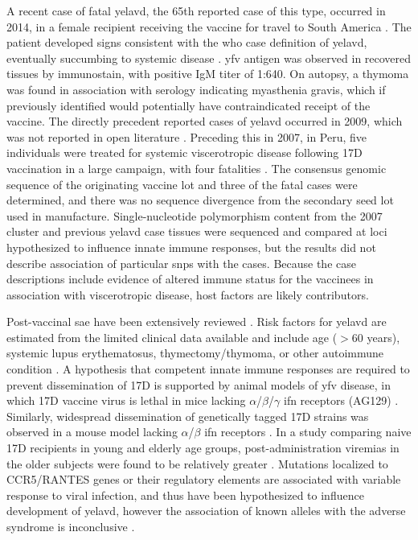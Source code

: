 A recent case of fatal \gls{yelavd}, the 65th reported case of this type, occurred in 2014, in a female recipient receiving the vaccine for travel to South America \parencite{DeSilva:2015ww}. The patient developed signs consistent with the \gls{who} case definition of \gls{yelavd}, eventually succumbing to systemic disease \parencite{Gershman:2012ji}. \Gls{yfv} antigen was observed in recovered tissues by immunostain, with positive IgM titer of 1:640. On autopsy, a thymoma was found in association with serology indicating myasthenia gravis, which if previously identified would potentially have contraindicated receipt of the vaccine. The directly precedent reported cases of \gls{yelavd} occurred in 2009, which was not reported in open literature \parencite[952]{Monath:2013cu}. Preceding this in 2007, in Peru, five individuals were treated for systemic viscerotropic disease following 17D vaccination in a large campaign, with four fatalities \parencite{Whittembury:2009hy}. The consensus genomic sequence of the originating vaccine lot and three of the fatal cases were determined, and there was no sequence divergence from the secondary seed lot used in manufacture. Single-nucleotide polymorphism content from the 2007 cluster and previous \gls{yelavd} case tissues were sequenced and compared at loci hypothesized to influence innate immune responses, but the results did not describe association of particular \glspl{snp} with the cases. Because the case descriptions include evidence of altered immune status for the vaccinees in association with viscerotropic disease, host factors are likely contributors.
	
Post-vaccinal \Gls{sae} have been extensively reviewed \parencite{Barrett:2009ed}. Risk factors for \gls{yelavd} are estimated from the limited clinical data available and include age ($>$60 years), systemic lupus erythematosus, thymectomy/thymoma, or other autoimmune condition \parencite{Monath:2005cw, Staples:2010ei}. A hypothesis that competent innate immune responses are required to prevent dissemination of 17D is supported by animal models of \gls{yfv} disease, in which 17D vaccine virus is lethal in mice lacking $\alpha$/$\beta$/$\gamma$ \gls{ifn} receptors (AG129) \parencite{Meier:2009ij}. Similarly, widespread dissemination of genetically tagged 17D strains was observed in a mouse model lacking $\alpha$/$\beta$ \gls{ifn} receptors \parencite{Erickson:2013kv}. In a study comparing naive 17D recipients in young and elderly age groups, post-administration viremias in the older subjects were found to be relatively greater \parencite{Roukens:2011dm}. Mutations localized to CCR5/RANTES genes or their regulatory elements are associated with variable response to viral infection, and thus have been hypothesized to influence development of \gls{yelavd}, however the association of known alleles with the adverse syndrome is inconclusive \parencite{Pulendran:2008eu}.

